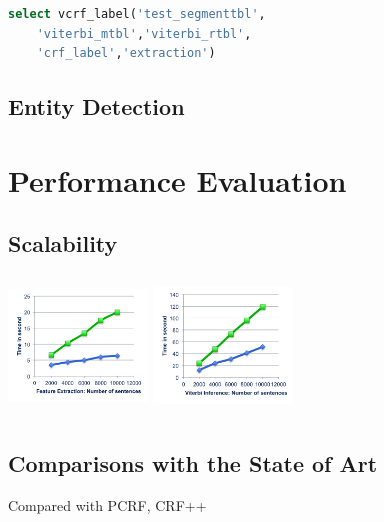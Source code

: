 \documentclass[11pt,letterpaper]{article}
\begin{document}
\begin{lstlisting}[language=SQL,gobble=4]
    select vcrf_label('test_segmenttbl', 
    'viterbi_mtbl','viterbi_rtbl',
    'crf_label','extraction')
\end{lstlisting}

\cite{DBLP:conf/icml/LaffertyMP01}
\cite{DBLP:journals/scholarpedia/Viterbi09}
\cite{DBLP:journals/siamjo/MoralesN00}
\cite{DBLP:journals/coling/DeRose88}
\cite{DBLP:conf/naacl/ShaP03}
\cite{DBLP:journals/coling/MarcusSM94}



\subsection{Entity Detection}

\section{Performance Evaluation}
\label{sec:length}

\subsection{Scalability}
\includegraphics[height=9.9em,width=10em]{extraction.png}
\includegraphics[height=9.9em,width=10em]{viterbi.png}

\subsection{Comparisons with the State of Art}
Compared with PCRF, CRF++
\end{document}

